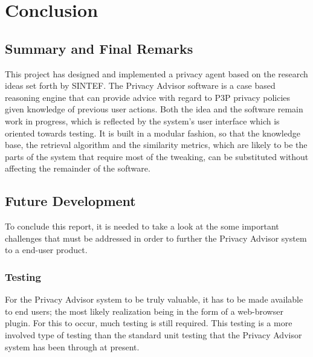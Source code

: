  

\chapter{Conclusion}\label{conclusion}

\minitoc

\section{Summary and Final Remarks}

This project has designed and implemented a privacy agent based on the
research ideas set forth by SINTEF. The Privacy Advisor software  is a
case based reasoning engine that can provide advice 
with regard to P3P privacy policies given knowledge of previous user
actions. Both the idea and the software remain work in progress,
which is reflected by the system's user interface which is oriented
towards testing. It is built in a modular fashion, so that the
knowledge base, the retrieval algorithm and the similarity metrics, which are likely to be the
parts of the system that require most of the tweaking, can
be substituted without affecting the remainder of the software.



\section{Future Development}

To conclude this report, it is needed to take a look at the some important challenges that
must be addressed in order to further the Privacy Advisor system to a end-user product.

\subsection{Testing}
For the Privacy Advisor system to be truly valuable, it has to be made
available to end users; the most likely realization being in the
form of a web-browser plugin. For this to occur, much testing is still
required. This testing is a more involved type of testing than the standard
unit testing that the Privacy Advisor system has been through at present.

